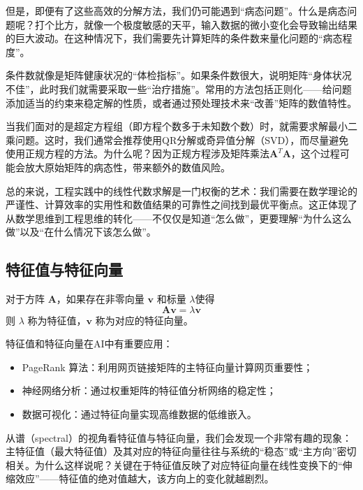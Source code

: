 但是，即便有了这些高效的分解方法，我们仍可能遇到“病态问题”。什么是病态问题呢？打个比方，就像一个极度敏感的天平，输入数据的微小变化会导致输出结果的巨大波动。在这种情况下，我们需要先计算矩阵的条件数来量化问题的“病态程度”。

条件数就像是矩阵健康状况的“体检指标”。如果条件数很大，说明矩阵“身体状况不佳”，此时我们就需要采取一些“治疗措施”。常用的方法包括正则化——给问题添加适当的约束来稳定解的性质，或者通过预处理技术来“改善”矩阵的数值特性。

当我们面对的是超定方程组（即方程个数多于未知数个数）时，就需要求解最小二乘问题。这时，我们通常会推荐使用QR分解或奇异值分解（SVD），而尽量避免使用正规方程的方法。为什么呢？因为正规方程涉及矩阵乘法$\mathbf{A}^T\mathbf{A}$，这个过程可能会放大原始矩阵的病态性，带来额外的数值风险。

总的来说，工程实践中的线性代数求解是一门权衡的艺术：我们需要在数学理论的严谨性、计算效率的实用性和数值结果的可靠性之间找到最优平衡点。这正体现了从数学思维到工程思维的转化——不仅仅是知道“怎么做”，更要理解“为什么这么做”以及“在什么情况下该怎么做”。

\subsection{特征值与特征向量}
对于方阵 $\mathbf{A}$，如果存在非零向量 $\mathbf{v}$ 和标量 $\lambda$使得
$$
\mathbf{A}\mathbf{v} = \lambda\mathbf{v}
$$
则 $\lambda$ 称为特征值，$\mathbf{v}$ 称为对应的特征向量。

特征值和特征向量在AI中有重要应用：
\begin{itemize}
  \item PageRank 算法：利用网页链接矩阵的主特征向量计算网页重要性；
  \item 神经网络分析：通过权重矩阵的特征值分析网络的稳定性；
  \item 数据可视化：通过特征向量实现高维数据的低维嵌入。
\end{itemize}
 

从谱（spectral）的视角看特征值与特征向量，我们会发现一个非常有趣的现象：主特征值（最大特征值）及其对应的特征向量往往与系统的“稳态”或“主方向”密切相关。为什么这样说呢？关键在于特征值反映了对应特征向量在线性变换下的“伸缩效应”——特征值的绝对值越大，该方向上的变化就越剧烈。

